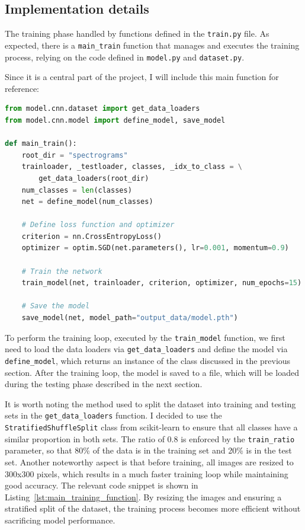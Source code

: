 \documentclass[12pt]{article}
\begin{document}
\subsection{Implementation details}

The training phase handled by functions defined in the \texttt{train.py} file. As expected, there is a \texttt{main\_train} function that manages and executes the training process, relying on the code defined in \texttt{model.py} and \texttt{dataset.py}.

Since it is a central part of the project, I will include this main function for reference:

\begin{lstlisting}[language=Python, caption=Main Training Function]
from model.cnn.dataset import get_data_loaders
from model.cnn.model import define_model, save_model

def main_train():
    root_dir = "spectrograms"
    trainloader, _testloader, classes, _idx_to_class = \
        get_data_loaders(root_dir)
    num_classes = len(classes)
    net = define_model(num_classes)

    # Define loss function and optimizer
    criterion = nn.CrossEntropyLoss()
    optimizer = optim.SGD(net.parameters(), lr=0.001, momentum=0.9)

    # Train the network
    train_model(net, trainloader, criterion, optimizer, num_epochs=15)

    # Save the model
    save_model(net, model_path="output_data/model.pth")
\end{lstlisting}

To perform the training loop, executed by the \texttt{train\_model} function, we first need to load the data loaders via \texttt{get\_data\_loaders} and define the model via \texttt{define\_model}, which returns an instance of the class discussed in the previous section. After the training loop, the model is saved to a file, which will be loaded during the testing phase described in the next section.

It is worth noting the method used to split the dataset into training and testing sets in the \texttt{get\_data\_loaders} function. I decided to use the \texttt{StratifiedShuffleSplit} class from scikit-learn to ensure that all classes have a similar proportion in both sets. The ratio of 0.8 is enforced by the \texttt{train\_ratio} parameter, so that 80\% of the data is in the training set and 20\% is in the test set. Another noteworthy aspect is that before training, all images are resized to 300x300 pixels, which results in a much faster training loop while maintaining good accuracy. The relevant code snippet is shown in Listing~\ref{lst:main_training_function}.
By resizing the images and ensuring a stratified split of the dataset, the training process becomes more efficient without sacrificing model performance.
\end{document}
